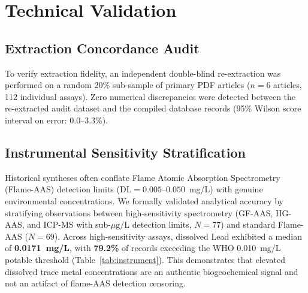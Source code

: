 \documentclass[11pt,a4paper]{article}
\begin{document}
\section*{Technical Validation}

\subsection*{Extraction Concordance Audit}
To verify extraction fidelity, an independent double-blind re-extraction was performed on a random 20\% sub-sample of primary PDF articles ($n=6$ articles, 112 individual assays). Zero numerical discrepancies were detected between the re-extracted audit dataset and the compiled database records (95\% Wilson score interval on error: 0.0--3.3\%).

\subsection*{Instrumental Sensitivity Stratification}
Historical syntheses often conflate Flame Atomic Absorption Spectrometry (Flame-AAS) detection limits ($\text{DL} = 0.005$--$0.050$~mg/L) with genuine environmental concentrations. We formally validated analytical accuracy by stratifying observations between high-sensitivity spectrometry (GF-AAS, HG-AAS, and ICP-MS with sub-$\mu\text{g/L}$ detection limits, $N=77$) and standard Flame-AAS ($N=69$). Across high-sensitivity assays, dissolved Lead exhibited a median of \textbf{0.0171~mg/L}, with \textbf{79.2\%} of records exceeding the WHO 0.010~mg/L potable threshold (Table~\ref{tab:instrument}). This demonstrates that elevated dissolved trace metal concentrations are an authentic biogeochemical signal and not an artifact of flame-AAS detection censoring.

\begin{table}[htbp]
\centering
\small
\caption{Validation of trace metal concentrations across analytical spectrometry tiers in surface water assays.}
\label{tab:instrument}
\end{table}
\end{document}
